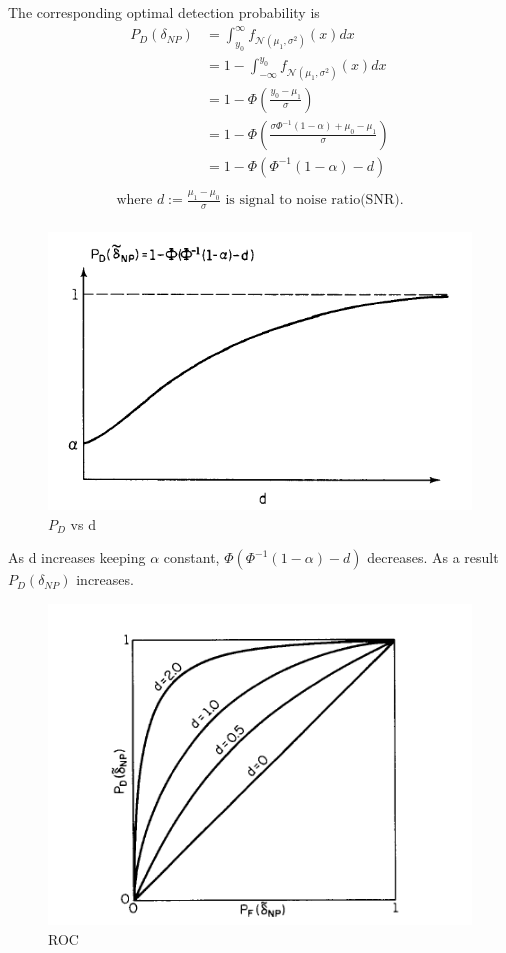 \documentclass[12pt]{report}
\begin{document}
The corresponding optimal detection probability is
\begin{align*}
P_D(\delta_{NP}) &= \int_{y_0}^{\infty} f_{\mathcal{N}(\mu_1,\sigma^2)}(x) dx\\
&=1 - \int_{-\infty}^{y_0} f_{\mathcal{N}(\mu_1,\sigma^2)}(x) dx\\
&=1- \Phi(\frac{y_0-\mu_1}{\sigma})\\
&=1-\Phi(\frac{\sigma\Phi^{-1}(1-\alpha)+\mu_0-\mu_1}{\sigma})\\
&=1-\Phi(\Phi^{-1}(1-\alpha)-d)\\[-20pt]
\end{align*}
\begin{align*}
{\text {where                                                                              } 
d := \frac{\mu_1-\mu_0}{\sigma} \text{ is signal to noise ratio(SNR).}}\\
\end{align*}
\begin{figure}[h]
\centering
\includegraphics[scale=0.75]{Figures/Power}
\caption{$P_D$ vs d}
\label{fig:$P_D$ vs d}
\end{figure}
As d increases keeping $\alpha$ constant, $\Phi(\Phi^{-1}(1-\alpha)-d)$ decreases.
As a result $P_D(\delta_{NP})$ increases.\\
\begin{figure}[h]
\centering
\includegraphics[scale=0.75]{Figures/ROC}
\caption{ROC}
\label{fig:ROC}
\end{figure}
\end{document}
